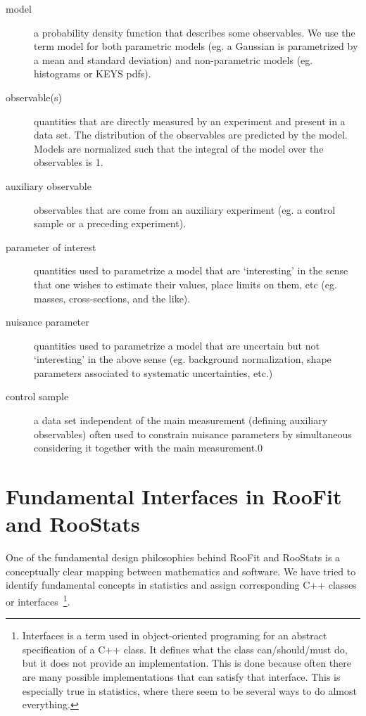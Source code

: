 \documentclass[11pt]{article}
\begin{document}
\begin{description}
\item[ model ] a probability density function that describes some observables.  We use the term model for both parametric models (eg. a Gaussian is parametrized by a mean and standard deviation) and non-parametric models (eg. histograms or KEYS pdfs).

\item[ observable(s)] quantities that are directly measured by an experiment and present in a data set.  The distribution of the observables are predicted by the model.  Models are normalized such that the integral of the model over the observables is 1.

\item[ auxiliary observable] observables that are come from an auxiliary experiment (eg. a control sample or a preceding experiment).

\item[ parameter of interest] quantities used to parametrize a model that are `interesting' in the sense that one wishes to estimate their values,  place limits on them, etc (eg. masses, cross-sections, and the like).

\item[ nuisance parameter ] quantities used to parametrize a model that are uncertain but not `interesting' in the above sense (eg. background normalization, shape parameters associated to systematic uncertainties, etc.)

\item[ control sample ] a data set independent of the main measurement (defining auxiliary observables) often used to constrain nuisance parameters by simultaneous considering it together with the main measurement.0

\end{description}



\section{Fundamental Interfaces in RooFit and RooStats}


One of the fundamental design philosophies behind RooFit and RooStats is a conceptually clear mapping between mathematics and software.  We have tried to identify fundamental concepts in statistics and assign corresponding C++ classes or interfaces~\footnote{Interfaces is a term used in object-oriented programing for an abstract specification of a C++ class.  It defines what the class can/should/must do, but it does not provide an implementation.  This is done because often there are many possible implementations that can satisfy that interface.  This is especially true in statistics, where there seem to be several ways to do almost everything.}.
\end{document}
